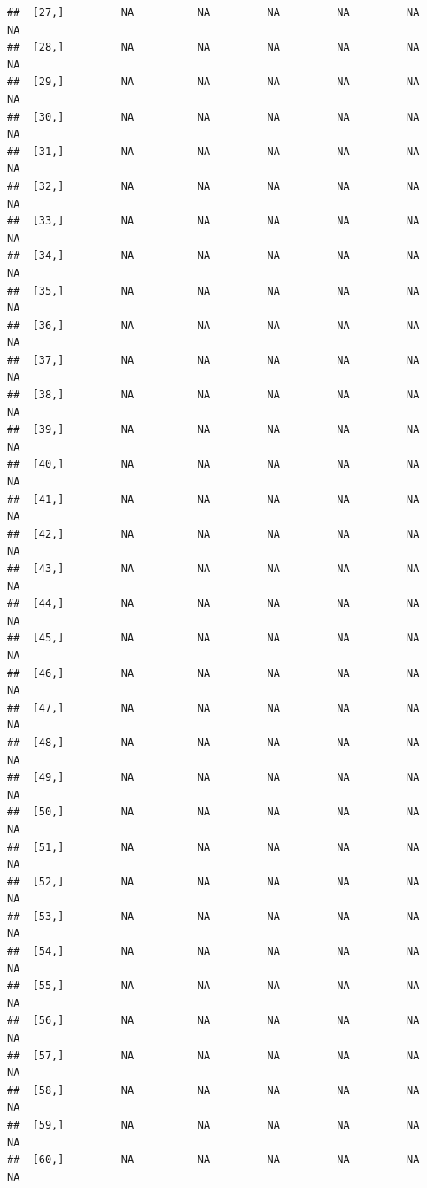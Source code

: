 \documentclass{article}\usepackage[]{graphicx}\usepackage[]{color}
\makeatletter
\newenvironment{kframe}{%
 \def\at@end@of@kframe{}%
 \ifinner\ifhmode%
  \def\at@end@of@kframe{\end{minipage}}%
  \begin{minipage}{\columnwidth}%
 \fi\fi%
 \def\FrameCommand##1{\hskip\@totalleftmargin \hskip-\fboxsep
 \colorbox{shadecolor}{##1}\hskip-\fboxsep
     \hskip-\linewidth \hskip-\@totalleftmargin \hskip\columnwidth}%
 \MakeFramed {\advance\hsize-\width
   \@totalleftmargin\z@ \linewidth\hsize
   \@setminipage}}%
 {\par\unskip\endMakeFramed%
 \at@end@of@kframe}
\newenvironment{knitrout}{}{} %
\makeatother
\begin{document}
\begin{knitrout}
\begin{kframe}
\begin{verbatim}
##  [27,]         NA          NA         NA         NA         NA          NA
##  [28,]         NA          NA         NA         NA         NA          NA
##  [29,]         NA          NA         NA         NA         NA          NA
##  [30,]         NA          NA         NA         NA         NA          NA
##  [31,]         NA          NA         NA         NA         NA          NA
##  [32,]         NA          NA         NA         NA         NA          NA
##  [33,]         NA          NA         NA         NA         NA          NA
##  [34,]         NA          NA         NA         NA         NA          NA
##  [35,]         NA          NA         NA         NA         NA          NA
##  [36,]         NA          NA         NA         NA         NA          NA
##  [37,]         NA          NA         NA         NA         NA          NA
##  [38,]         NA          NA         NA         NA         NA          NA
##  [39,]         NA          NA         NA         NA         NA          NA
##  [40,]         NA          NA         NA         NA         NA          NA
##  [41,]         NA          NA         NA         NA         NA          NA
##  [42,]         NA          NA         NA         NA         NA          NA
##  [43,]         NA          NA         NA         NA         NA          NA
##  [44,]         NA          NA         NA         NA         NA          NA
##  [45,]         NA          NA         NA         NA         NA          NA
##  [46,]         NA          NA         NA         NA         NA          NA
##  [47,]         NA          NA         NA         NA         NA          NA
##  [48,]         NA          NA         NA         NA         NA          NA
##  [49,]         NA          NA         NA         NA         NA          NA
##  [50,]         NA          NA         NA         NA         NA          NA
##  [51,]         NA          NA         NA         NA         NA          NA
##  [52,]         NA          NA         NA         NA         NA          NA
##  [53,]         NA          NA         NA         NA         NA          NA
##  [54,]         NA          NA         NA         NA         NA          NA
##  [55,]         NA          NA         NA         NA         NA          NA
##  [56,]         NA          NA         NA         NA         NA          NA
##  [57,]         NA          NA         NA         NA         NA          NA
##  [58,]         NA          NA         NA         NA         NA          NA
##  [59,]         NA          NA         NA         NA         NA          NA
##  [60,]         NA          NA         NA         NA         NA          NA

\end{verbatim}
\end{kframe}
\end{knitrout}
\end{document}
